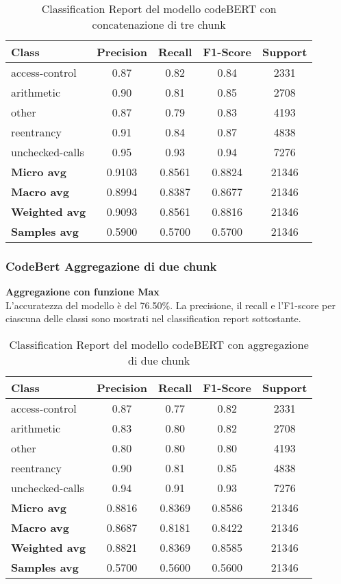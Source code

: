 \documentclass[../../Thesis.tex]{subfiles}
\begin{document}
\begin{table}[H]
\centering
\small
\begin{tabular}{lcccc}
\hline
\textbf{Class} & \textbf{Precision} & \textbf{Recall} & \textbf{F1-Score} & \textbf{Support} \\
\hline
access-control & 0.87 & 0.82 & 0.84 & 2331 \\
arithmetic & 0.90 & 0.81 & 0.85 & 2708 \\
other & 0.87 & 0.79 & 0.83 & 4193 \\
reentrancy & 0.91 & 0.84 & 0.87 & 4838 \\
unchecked-calls & 0.95 & 0.93 & 0.94 & 7276 \\
\hline
\textbf{Micro avg} & 0.9103 & 0.8561 & 0.8824 & 21346 \\
\textbf{Macro avg} & 0.8994 & 0.8387 & 0.8677 & 21346 \\
\textbf{Weighted avg} & 0.9093 & 0.8561 & 0.8816 & 21346 \\
\textbf{Samples avg} & 0.5900 & 0.5700 & 0.5700 & 21346 \\
\hline
\end{tabular}
\caption{Classification Report del modello codeBERT con concatenazione di tre chunk}
\end{table}

\subsubsection{CodeBert Aggregazione di due chunk}
\textbf{Aggregazione con funzione Max}\\
L'accuratezza del modello è del 76.50\%. La precisione, il recall e l'F1-score per ciascuna delle classi sono mostrati nel classification report sottostante.

\begin{table}[H]
    \centering
    \small
    \begin{tabular}{lcccc}
    \hline
    \textbf{Class} & \textbf{Precision} & \textbf{Recall} & \textbf{F1-Score} & \textbf{Support} \\
    \hline
    access-control & 0.87 & 0.77 & 0.82 & 2331 \\
    arithmetic & 0.83 & 0.80 & 0.82 & 2708 \\
    other & 0.80 & 0.80 & 0.80 & 4193 \\
    reentrancy & 0.90 & 0.81 & 0.85 & 4838 \\
    unchecked-calls & 0.94 & 0.91 & 0.93 & 7276 \\
    \hline
    \textbf{Micro avg} & 0.8816 & 0.8369 & 0.8586 & 21346 \\
    \textbf{Macro avg} & 0.8687 & 0.8181 & 0.8422 & 21346 \\
    \textbf{Weighted avg} & 0.8821 & 0.8369 & 0.8585 & 21346 \\
    \textbf{Samples avg} & 0.5700 & 0.5600 & 0.5600 & 21346 \\
    \hline
    \end{tabular}
    \caption{Classification Report del modello codeBERT con aggregazione di due chunk}
    \end{table}
\end{document}

